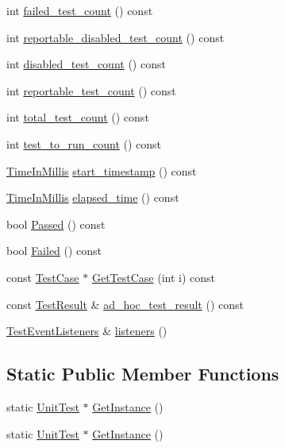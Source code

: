 \begin{DoxyCompactItemize}
\item 
int \hyperlink{classtesting_1_1_unit_test_aeda0f8ca87adf65f634c3d6d9ab98598}{failed\-\_\-test\-\_\-count} () const 
\item 
int \hyperlink{classtesting_1_1_unit_test_aa5eaf98c5d9cc0afe501ac03e6414188}{reportable\-\_\-disabled\-\_\-test\-\_\-count} () const 
\item 
int \hyperlink{classtesting_1_1_unit_test_a4cbd084447b74784d1bb85c1ed4b96d5}{disabled\-\_\-test\-\_\-count} () const 
\item 
int \hyperlink{classtesting_1_1_unit_test_aa32cb4f3cd34564a5c641bd409f8f83b}{reportable\-\_\-test\-\_\-count} () const 
\item 
int \hyperlink{classtesting_1_1_unit_test_a54315b233d354693b9aa1184cf2996de}{total\-\_\-test\-\_\-count} () const 
\item 
int \hyperlink{classtesting_1_1_unit_test_a953a52f89898a04ee4a4e08469407cd3}{test\-\_\-to\-\_\-run\-\_\-count} () const 
\item 
\hyperlink{namespacetesting_a992de1d091ce660f451d1e8b3ce30fd6}{Time\-In\-Millis} \hyperlink{classtesting_1_1_unit_test_adb9fdaf25b601f91bd55606941d05c80}{start\-\_\-timestamp} () const 
\item 
\hyperlink{namespacetesting_a992de1d091ce660f451d1e8b3ce30fd6}{Time\-In\-Millis} \hyperlink{classtesting_1_1_unit_test_a87853e2fe9f0b172467534323cb9d267}{elapsed\-\_\-time} () const 
\item 
bool \hyperlink{classtesting_1_1_unit_test_a4ef49e958702bf741e7eaa4864e28a48}{Passed} () const 
\item 
bool \hyperlink{classtesting_1_1_unit_test_ad7711156d07d6037d8f497e5c385f78d}{Failed} () const 
\item 
const \hyperlink{classtesting_1_1_test_case}{Test\-Case} $\ast$ \hyperlink{classtesting_1_1_unit_test_a7967986c217975d4de70739d28b4109d}{Get\-Test\-Case} (int i) const 
\item 
const \hyperlink{classtesting_1_1_test_result}{Test\-Result} \& \hyperlink{classtesting_1_1_unit_test_ab4ecadf87d00bc67d15553e2998ef81d}{ad\-\_\-hoc\-\_\-test\-\_\-result} () const 
\item 
\hyperlink{classtesting_1_1_test_event_listeners}{Test\-Event\-Listeners} \& \hyperlink{classtesting_1_1_unit_test_a1b7387b0b3daa2433ed6b685027bf285}{listeners} ()
\end{DoxyCompactItemize}
\subsection*{Static Public Member Functions}
\begin{DoxyCompactItemize}
\item 
static \hyperlink{classtesting_1_1_unit_test}{Unit\-Test} $\ast$ \hyperlink{classtesting_1_1_unit_test_a24192400b70b3b946746954e9574fb8e}{Get\-Instance} ()
\item 
static \hyperlink{classtesting_1_1_unit_test}{Unit\-Test} $\ast$ \hyperlink{classtesting_1_1_unit_test_af254e2e695471eb9f128bc556bae3668}{Get\-Instance} ()
\end{DoxyCompactItemize}
